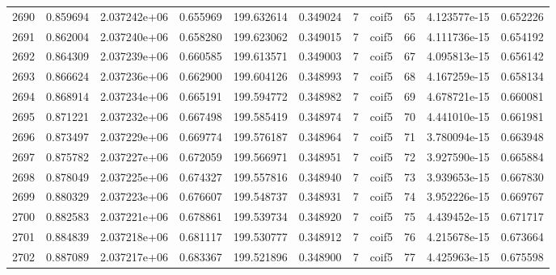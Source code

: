 \begin{tabular}{lrrrrrrlrrr}
2690 &    0.859694 &        2.037242e+06 &  0.655969 &              199.632614 &    0.349024 &       7 &        coif5 &     65 &   4.123577e-15 &      0.652226 \\
2691 &    0.862004 &        2.037240e+06 &  0.658280 &              199.623062 &    0.349015 &       7 &        coif5 &     66 &   4.111736e-15 &      0.654192 \\
2692 &    0.864309 &        2.037239e+06 &  0.660585 &              199.613571 &    0.349003 &       7 &        coif5 &     67 &   4.095813e-15 &      0.656142 \\
2693 &    0.866624 &        2.037236e+06 &  0.662900 &              199.604126 &    0.348993 &       7 &        coif5 &     68 &   4.167259e-15 &      0.658134 \\
2694 &    0.868914 &        2.037234e+06 &  0.665191 &              199.594772 &    0.348982 &       7 &        coif5 &     69 &   4.678721e-15 &      0.660081 \\
2695 &    0.871221 &        2.037232e+06 &  0.667498 &              199.585419 &    0.348974 &       7 &        coif5 &     70 &   4.441010e-15 &      0.661981 \\
2696 &    0.873497 &        2.037229e+06 &  0.669774 &              199.576187 &    0.348964 &       7 &        coif5 &     71 &   3.780094e-15 &      0.663948 \\
2697 &    0.875782 &        2.037227e+06 &  0.672059 &              199.566971 &    0.348951 &       7 &        coif5 &     72 &   3.927590e-15 &      0.665884 \\
2698 &    0.878049 &        2.037225e+06 &  0.674327 &              199.557816 &    0.348940 &       7 &        coif5 &     73 &   3.939653e-15 &      0.667830 \\
2699 &    0.880329 &        2.037223e+06 &  0.676607 &              199.548737 &    0.348931 &       7 &        coif5 &     74 &   3.952226e-15 &      0.669767 \\
2700 &    0.882583 &        2.037221e+06 &  0.678861 &              199.539734 &    0.348920 &       7 &        coif5 &     75 &   4.439452e-15 &      0.671717 \\
2701 &    0.884839 &        2.037218e+06 &  0.681117 &              199.530777 &    0.348912 &       7 &        coif5 &     76 &   4.215678e-15 &      0.673664 \\
2702 &    0.887089 &        2.037217e+06 &  0.683367 &              199.521896 &    0.348900 &       7 &        coif5 &     77 &   4.425963e-15 &      0.675598 \\

\end{tabular}
